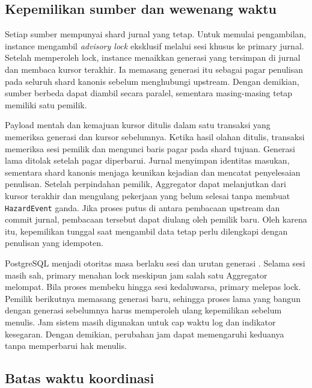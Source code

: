 \subsection{Kepemilikan sumber dan wewenang waktu}

Setiap sumber mempunyai shard jurnal yang tetap. Untuk memulai pengambilan, instance mengambil \emph{advisory lock} eksklusif melalui sesi khusus ke primary jurnal. Setelah memperoleh lock, instance menaikkan generasi yang tersimpan di jurnal dan membaca kursor terakhir. Ia memasang generasi itu sebagai pagar penulisan pada seluruh shard kanonis sebelum menghubungi upstream. Dengan demikian, sumber berbeda dapat diambil secara paralel, sementara masing-masing tetap memiliki satu pemilik.

Payload mentah dan kemajuan kursor ditulis dalam satu transaksi yang memeriksa generasi dan kursor sebelumnya. Ketika hasil olahan ditulis, transaksi memeriksa sesi pemilik dan mengunci baris pagar pada shard tujuan. Generasi lama ditolak setelah pagar diperbarui. Jurnal menyimpan identitas masukan, sementara shard kanonis menjaga keunikan kejadian dan mencatat penyelesaian penulisan. Setelah perpindahan pemilik, Aggregator dapat melanjutkan dari kursor terakhir dan mengulang pekerjaan yang belum selesai tanpa membuat \texttt{HazardEvent} ganda. Jika proses putus di antara pembacaan upstream dan commit jurnal, pembacaan tersebut dapat diulang oleh pemilik baru. Oleh karena itu, kepemilikan tunggal saat mengambil data tetap perlu dilengkapi dengan penulisan yang idempoten.

PostgreSQL menjadi otoritas masa berlaku sesi dan urutan generasi \cite{postgres}. Selama sesi masih sah, primary menahan lock meskipun jam salah satu Aggregator melompat. Bila proses membeku hingga sesi kedaluwarsa, primary melepas lock. Pemilik berikutnya memasang generasi baru, sehingga proses lama yang bangun dengan generasi sebelumnya harus memperoleh ulang kepemilikan sebelum menulis. Jam sistem masih digunakan untuk cap waktu log dan indikator kesegaran. Dengan demikian, perubahan jam dapat memengaruhi keduanya tanpa memperbarui hak menulis.

\subsection{Batas waktu koordinasi}

